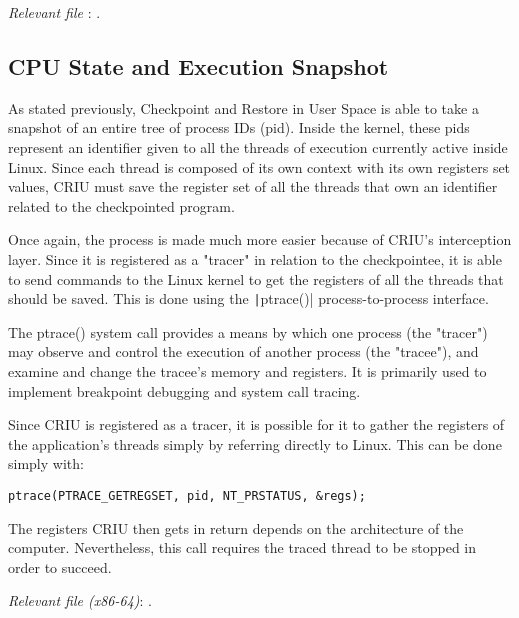 \hfill\textit{Relevant file }: .

\subsection*{CPU State and Execution Snapshot}
As stated previously, Checkpoint and Restore in User Space is able to take a snapshot of an entire tree of process IDs (pid). Inside the kernel, these pids represent an identifier given to all the threads of execution currently active inside Linux. Since each thread is composed of its own context with its own registers set values, CRIU must save the register set of all the threads that own an identifier related to the checkpointed program.

Once again, the process is made much more easier because of CRIU's interception layer. Since it is registered as a "tracer" in relation to the checkpointee, it is able to send commands to the Linux kernel to get the registers of all the threads that should be saved. This is done using the \texttt|ptrace()| process-to-process interface.
\begin{shadedquotation}
The ptrace() system call provides a means by which one process (the "tracer") may observe and control the execution of another process (the "tracee"), and examine and change the tracee's memory and registers.  It is primarily used to implement breakpoint debugging and system call tracing.
\cite{on:ptrace}
\end{shadedquotation}
Since CRIU is registered as a tracer, it is possible for it to gather the registers of the application's threads simply by referring directly to Linux. This can be done simply with:
\begin{verbatim}
ptrace(PTRACE_GETREGSET, pid, NT_PRSTATUS, &regs);
\end{verbatim}
The registers CRIU then gets in return depends on the architecture of the computer. Nevertheless, this call requires the traced thread to be stopped in order to succeed.

\hfill\textit{Relevant file (x86-64)}: .

